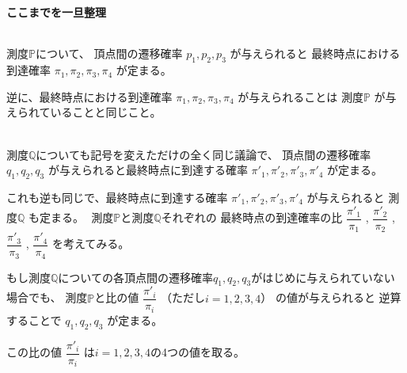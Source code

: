 \documentclass[uplatex,a4j,12pt,dvipdfmx]{jsarticle}
\begin{document}
\ \\

\paragraph{ここまでを一旦整理}

${}$

測度$\mathbb{P}$について、
頂点間の遷移確率
$p_{1},p_{2},p_{3}$
が与えられると
最終時点における到達確率
$\pi_{1},\pi_{2},\pi_{3},\pi_{4}$
が定まる。

逆に、最終時点における到達確率
$\pi_{1},\pi_{2},\pi_{3},\pi_{4}$
が与えられることは
測度$\mathbb{P}$
が与えられていることと同じこと。

\ \\

測度$\mathbb{Q}$についても記号を変えただけの全く同じ議論で、
頂点間の遷移確率
$q_{1},q_{2},q_{3}$
が与えられると最終時点に到達する確率
$\pi'_{1},\pi'_{2},\pi'_{3},\pi'_{4}$
が定まる。

これも逆も同じで、最終時点に到達する確率
$\pi'_{1},\pi'_{2},\pi'_{3},\pi'_{4}$
が与えられると
測度$\mathbb{Q}$
も定まる。
${}$
測度$\mathbb{P}$と測度$\mathbb{Q}$それぞれの
最終時点の到達確率の比
$\dfrac{ \pi'_{1} }{ \pi_{1} }$
,
$\dfrac{ \pi'_{2} }{ \pi_{2} }$
,
$\dfrac{ \pi'_{3} }{ \pi_{3} }$
,
$\dfrac{ \pi'_{4} }{ \pi_{4} }$
を考えてみる。

もし測度$\mathbb{Q}$についての各頂点間の遷移確率$q_{1},q_{2},q_{3}$がはじめに与えられていない場合でも、
測度$\mathbb{P}$と比の値
$\dfrac{ \pi'_{i} }{ \pi_{i} }$
（ただし$i=1,2,3,4$）
の値が与えられると
逆算することで
$q_{1},q_{2},q_{3}$
が定まる。

この比の値
$\dfrac{ \pi'_{i} }{ \pi_{i} }$
は$i=1,2,3,4$の4つの値を取る。
\end{document}
